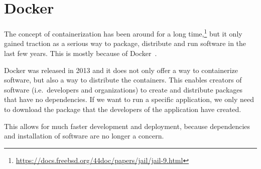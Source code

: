 \section{Docker}\label{background:docker}
The concept of containerization has been around for a long time,\footnote{\url{https://docs.freebsd.org/44doc/papers/jail/jail-9.html}} but it only gained traction as a serious way to package, distribute and run software in the last few years. This is mostly because of Docker~\cite{Docker-Popular}.

\medskip

Docker was released in 2013 and it does not only offer a way to containerize software, but also a way to distribute the containers. This enables creators of software (i.e.\ developers and organizations) to create and distribute packages that have no dependencies. If we want to run a specific application, we only need to download the package that the developers of the application have created.

This allows for much faster development and deployment, because dependencies and installation of software are no longer a concern.









